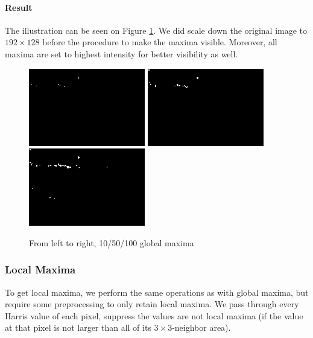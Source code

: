 \documentclass[a4paper, 10pt]{article}
\begin{document}
\paragraph{Result} The illustration can be seen on Figure \ref{fig-global}. We did scale down the original image to $192\times128$ before the procedure to make the maxima visible. Moreover, all maxima are set to highest intensity for better visibility as well.
\begin{figure}[!htb]
\centering
\includegraphics[width=192px]{boat3x3_5_global_10.png}
\includegraphics[width=192px]{boat3x3_5_global_50.png}
\includegraphics[width=192px]{boat3x3_5_global_100.png}
\caption{From left to right, 10/50/100 global maxima}
\label{fig-global}
\end{figure}

\subsubsection{Local Maxima}
To get local maxima, we perform the same operations as with global maxima, but require some preprocessing to only retain local maxima. We pass through every Harris value of each pixel, suppress the values are not local maxima (if the value at that pixel is not larger than all of its $3\times3$-neighbor area).
\end{document}
